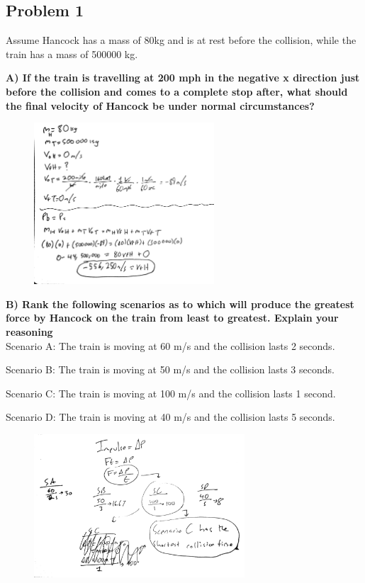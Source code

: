 \documentclass[a4paper,12pt]{article}
\begin{document}
\subsection{Problem 1}
Assume Hancock has a mass of 80kg and is at rest before the collision, while the train has a mass of 500000 kg.

\noindent\textbf{A) If the train is travelling at 200 mph in the negative x direction just before the collision and comes to a complete stop after, what should the final velocity of Hancock be under normal circumstances? } \\


\begin{figure}[H]
    \centering
    \includegraphics[width=0.6\textwidth]{U4_P1_A.jpg} %
\end{figure} 

\newpage

\noindent\textbf{B) Rank the following scenarios as to which will produce the greatest force by Hancock on the train from least to greatest. Explain your reasoning } \\

Scenario A: The train is moving at 60 m/s and the collision lasts 2 seconds.

Scenario B: The train is moving at 50 m/s and the collision lasts 3 seconds.

Scenario C: The train is moving at 100 m/s and the collision lasts 1 second.

Scenario D: The train is moving at 40 m/s and the collision lasts 5 seconds.




\begin{figure}[H]
    \centering
    \includegraphics[width=0.7\textwidth]{U4_P1_B.jpg} %
\end{figure} 
\end{document}
